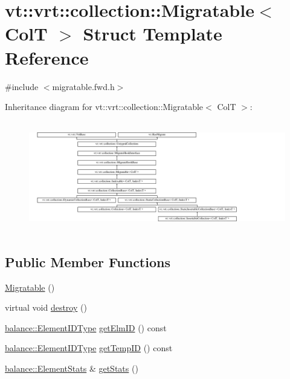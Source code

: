 \hypertarget{structvt_1_1vrt_1_1collection_1_1_migratable}{}\section{vt\+:\+:vrt\+:\+:collection\+:\+:Migratable$<$ ColT $>$ Struct Template Reference}
\label{structvt_1_1vrt_1_1collection_1_1_migratable}


{\ttfamily \#include $<$migratable.\+fwd.\+h$>$}

Inheritance diagram for vt\+:\+:vrt\+:\+:collection\+:\+:Migratable$<$ ColT $>$\+:\begin{figure}[H]
\begin{center}
\leavevmode
\includegraphics[height=4.873803cm]{structvt_1_1vrt_1_1collection_1_1_migratable}
\end{center}
\end{figure}
\subsection*{Public Member Functions}
\begin{DoxyCompactItemize}
\item 
\hyperlink{structvt_1_1vrt_1_1collection_1_1_migratable_aed21a92808d62ff482cb44d750267b0c}{Migratable} ()
\item 
virtual void \hyperlink{structvt_1_1vrt_1_1collection_1_1_migratable_a06210254fae9b543b5db7543760ae33d}{destroy} ()
\item 
\hyperlink{namespacevt_1_1vrt_1_1collection_1_1balance_a14c8d2c972f2913aa3f1636e5be0a120}{balance\+::\+Element\+I\+D\+Type} \hyperlink{structvt_1_1vrt_1_1collection_1_1_migratable_acf870053154679cbcda64e42ff479302}{get\+Elm\+ID} () const
\item 
\hyperlink{namespacevt_1_1vrt_1_1collection_1_1balance_a14c8d2c972f2913aa3f1636e5be0a120}{balance\+::\+Element\+I\+D\+Type} \hyperlink{structvt_1_1vrt_1_1collection_1_1_migratable_ad4b0d23e17edfa41221af6eefb05ad69}{get\+Temp\+ID} () const
\item 
\hyperlink{structvt_1_1vrt_1_1collection_1_1balance_1_1_element_stats}{balance\+::\+Element\+Stats} \& \hyperlink{structvt_1_1vrt_1_1collection_1_1_migratable_aad0c3895e538ca34ff2e75ec0e121dfa}{get\+Stats} ()
\end{DoxyCompactItemize}
